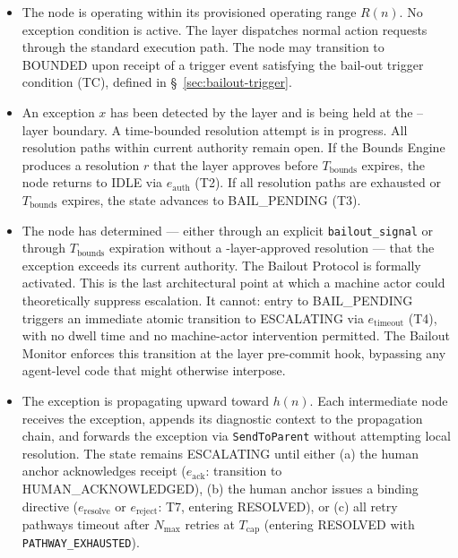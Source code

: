 \begin{itemize}\itemsep=0pt

\item[\textbf{IDLE.}] The node is operating within its provisioned operating range $R(n)$. No exception condition is active. The \fact{} layer dispatches normal action requests through the standard execution path. The node may transition to BOUNDED upon receipt of a trigger event satisfying the bail-out trigger condition (TC), defined in \S~\ref{sec:bailout-trigger}.

\item[\textbf{BOUNDED.}] An exception $x$ has been detected by the \bounds{} layer and is being held at the \bounds{}--\fact{} layer boundary. A time-bounded resolution attempt is in progress. All resolution paths within current authority remain open. If the Bounds Engine produces a resolution $r$ that the \fact{} layer approves before $T_{\text{bounds}}$ expires, the node returns to IDLE via $e_{\text{auth}}$ (T2). If all resolution paths are exhausted or $T_{\text{bounds}}$ expires, the state advances to BAIL\_PENDING (T3).

\item[\textbf{BAIL\_PENDING.}] The node has determined — either through an explicit \texttt{bailout\_signal} or through $T_{\text{bounds}}$ expiration without a \fact-layer-approved resolution — that the exception exceeds its current authority. The Bailout Protocol is formally activated. This is the last architectural point at which a machine actor could theoretically suppress escalation. It cannot: entry to BAIL\_PENDING triggers an immediate atomic transition to ESCALATING via $e_{\text{timeout}}$ (T4), with no dwell time and no machine-actor intervention permitted. The Bailout Monitor enforces this transition at the \fact{} layer pre-commit hook, bypassing any agent-level code that might otherwise interpose.

\item[\textbf{ESCALATING.}] The exception is propagating upward toward $h(n)$. Each intermediate node receives the exception, appends its diagnostic context to the propagation chain, and forwards the exception via \texttt{SendToParent} without attempting local resolution. The state remains ESCALATING until either (a) the human anchor acknowledges receipt ($e_{\text{ack}}$: transition to HUMAN\_ACKNOWLEDGED), (b) the human anchor issues a binding directive ($e_{\text{resolve}}$ or $e_{\text{reject}}$: T7, entering RESOLVED), or (c) all retry pathways timeout after $N_{\max}$ retries at $T_{\text{cap}}$ (entering RESOLVED with \texttt{PATHWAY\_EXHAUSTED}).


\end{itemize}
